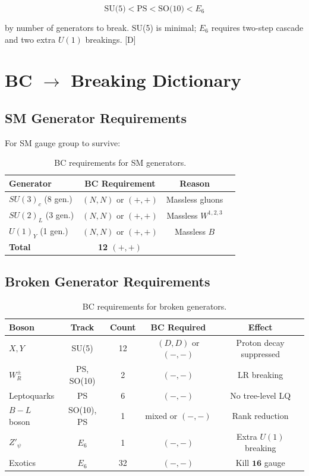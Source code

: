 \documentclass[11pt,a4paper]{article}
\newcommand{\tagD}{\textcolor{blue!70!black}{[D]}}
\begin{document}
\begin{equation}
\label{eq:complexity}
\text{SU(5)} < \text{PS} < \text{SO(10)} < E_6
\end{equation}

by number of generators to break. SU(5) is minimal; $E_6$ requires two-step
cascade and two extra $U(1)$ breakings. \tagD

\section{BC $\to$ Breaking Dictionary}

\subsection{SM Generator Requirements}

For SM gauge group to survive:

\begin{table}[h]
\centering
\begin{tabular}{lccc}
\toprule
Generator & BC Requirement & Reason \\
\midrule
$SU(3)_c$ (8 gen.) & $(N,N)$ or $(+,+)$ & Massless gluons \\
$SU(2)_L$ (3 gen.) & $(N,N)$ or $(+,+)$ & Massless $W^{1,2,3}$ \\
$U(1)_Y$ (1 gen.) & $(N,N)$ or $(+,+)$ & Massless $B$ \\
\midrule
\textbf{Total} & \textbf{12 $(+,+)$} & \\
\bottomrule
\end{tabular}
\caption{BC requirements for SM generators.}
\label{tab:sm-bc}
\end{table}

\subsection{Broken Generator Requirements}

\begin{table}[h]
\centering
\begin{tabular}{lcccc}
\toprule
Boson & Track & Count & BC Required & Effect \\
\midrule
$X, Y$ & SU(5) & 12 & $(D,D)$ or $(-,-)$ & Proton decay suppressed \\
$W_R^\pm$ & PS, SO(10) & 2 & $(-,-)$ & LR breaking \\
Leptoquarks & PS & 6 & $(-,-)$ & No tree-level LQ \\
$B-L$ boson & SO(10), PS & 1 & mixed or $(-,-)$ & Rank reduction \\
$Z'_\psi$ & $E_6$ & 1 & $(-,-)$ & Extra $U(1)$ breaking \\
Exotics & $E_6$ & 32 & $(-,-)$ & Kill $\mathbf{16}$ gauge \\
\bottomrule
\end{tabular}
\caption{BC requirements for broken generators.}
\label{tab:broken-bc}
\end{table}
\end{document}
